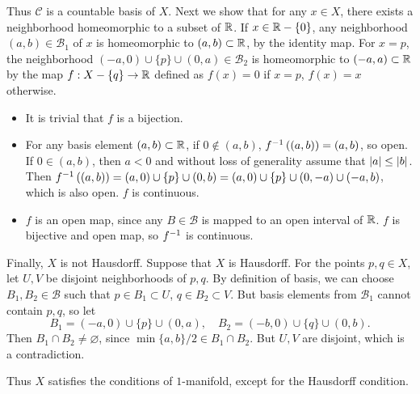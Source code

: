 \documentclass[12pt]{report}
\newcommand{\B}{\mathcal{B}}
\renewcommand{\C}{\mathcal{C}}
\begin{document}
\begin{enumerate}
    Thus \(\C\) is a countable basis of \(X\). Next we show that for any \(x \in X\), there exists a neighborhood homeomorphic to a subset of \(\mathbb{R}\). If \(x \in \mathbb{R} - \{0\}\), any neighborhood \((a, b) \in \B_1\) of \(x\) is homeomorphic to \((a, b) \subset \mathbb{R}\), by the identity map. For \(x = p\), the neighborhood \((-a, 0) \cup \{p\} \cup (0, a) \in \B_2\) is homeomorphic to \((-a, a) \subset \mathbb{R}\) by the map \(f : X - \{q\} \rightarrow \mathbb{R}\) defined as \(f(x) = 0\) if \(x = p\), \(f(x) = x\) otherwise.
    \begin{itemize}
        \item It is trivial that \(f\) is a bijection.
        \item For any basis element \((a, b) \subset \mathbb{R}\), if \(0 \notin (a, b)\), \(f^{-1}\left( (a, b) \right) = (a, b)\), so open. If \(0 \in (a, b)\), then \(a < 0\) and without loss of generality assume that \(\left| a \right| \leq \left| b \right|\). Then \(f^{-1}\left( (a, b) \right) = (a, 0) \cup \{p\} \cup (0, b) = (a, 0) \cup \{p\} \cup (0, -a) \cup (-a, b)\), which is also open. \(f\) is continuous.
        \item \(f\) is an open map, since any \(B \in \B\) is mapped to an open interval of \(\mathbb{R}\). \(f\) is bijective and open map, so \(f^{-1}\) is continuous.
    \end{itemize}

    Finally, \(X\) is not Hausdorff. Suppose that \(X\) is Hausdorff. For the points \(p, q \in X\), let \(U, V\) be disjoint neighborhoods of \(p, q\). By definition of basis, we can choose \(B_1, B_2 \in \B\) such that \(p \in B_1 \subset U\), \(q \in B_2 \subset V\). But basis elements from \(\B_1\) cannot contain \(p, q\), so let
    \[
        B_1 = (-a, 0) \cup \{p\} \cup (0, a), \quad B_2 = (-b, 0) \cup \{q\} \cup (0, b).
    \]
    Then \(B_1 \cap B_2 \neq \varnothing\), since \(\min\{a, b\} / 2 \in B_1 \cap B_2\). But \(U, V\) are disjoint, which is a contradiction.

    Thus \(X\) satisfies the conditions of \(1\)-manifold, except for the Hausdorff condition.
\end{enumerate}
\end{document}
